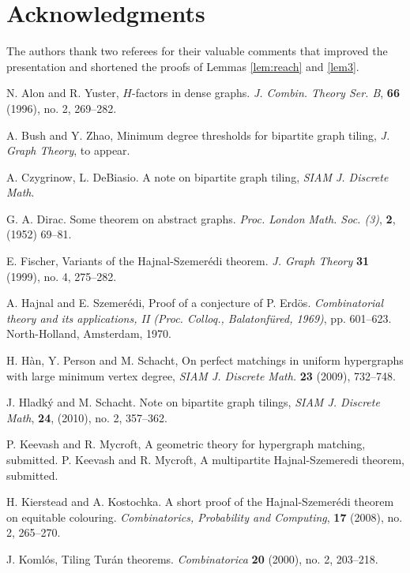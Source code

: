 \documentclass[reqno]{amsart}
\theoremstyle{plain}
\begin{document}
\section*{Acknowledgments}
The authors thank two referees for their valuable comments that improved the presentation and shortened the proofs of Lemmas \ref{lem:reach} and \ref{lem3}.







\begin{thebibliography}{99}

 N. Alon and R. Yuster, $H$-factors in dense
graphs. {\em J. Combin. Theory Ser. B}, {\bf 66} (1996), no. 2,
269--282.

 A. Bush and Y. Zhao, Minimum degree thresholds for bipartite graph tiling, \emph{J. Graph Theory}, to appear.

A. Czygrinow, L. DeBiasio.  A note on bipartite graph tiling, {\em SIAM J. Discrete
Math}.

  G. A. Dirac.  Some theorem on abstract graphs.
{\em Proc. London Math. Soc. (3)}, {\bf 2}, (1952) 69--81.

 E. Fischer, Variants of the Hajnal-Szemer\'edi
theorem. {\em J. Graph Theory} {\bf 31} (1999), no. 4, 275--282.

 A. Hajnal and E. Szemer\'edi, Proof of a
conjecture of P. Erd\"os. {\em Combinatorial theory and its
applications, II (Proc. Colloq., Balatonf\"ured, 1969)}, pp.
601--623.  North-Holland, Amsterdam, 1970.

 H. H\`an, Y. Person and M. Schacht, On perfect matchings in uniform hypergraphs with large minimum vertex degree,
\emph{SIAM J. Discrete Math.} {\bf 23} (2009), 732--748.

J. Hladk\'{y} and M. Schacht. Note on bipartite graph tilings,
{\em SIAM J. Discrete Math}, {\bf 24}, (2010), no. 2, 357–362.

P. Keevash and R. Mycroft, A geometric theory for hypergraph matching, submitted.
P. Keevash and R. Mycroft, A multipartite Hajnal-Szemeredi theorem, submitted.

H.  Kierstead and A. Kostochka. A short proof of the Hajnal-Szemer\'edi theorem on equitable
colouring. {\em Combinatorics, Probability and Computing}, {\bf 17} (2008), no. 2, 265--270.

 J. Koml\'os, Tiling  Tur\'{a}n theorems.
{\em Combinatorica} {\bf 20} (2000), no. 2, 203--218.


\end{thebibliography}
\end{document}
